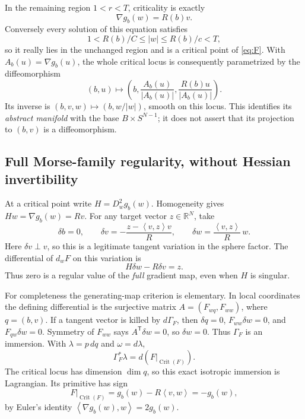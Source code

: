 \documentclass[11pt]{article}
\theoremstyle{remark}
\newcommand{\R}{\mathbb R}
\newcommand{\Crit}{\operatorname{Crit}}
\newcommand{\ip}[2]{\left\langle #1,#2\right\rangle}
\begin{document}
In the remaining region \(1<r<T\), criticality is exactly
\begin{equation}\label{eq:critical}
                     \nabla g_b(w)=R(b)v.
\end{equation}
Conversely every solution of this equation satisfies
\[
           1<R(b)/C\leq |w|\leq R(b)/c<T,
\]
so it really lies in the unchanged region and is a critical point
of \eqref{eq:F}. With \(A_b(u)=\nabla g_b(u)\), the whole critical
locus is consequently parametrized by the diffeomorphism
\begin{equation}\label{eq:param}
 (b,u)\longmapsto
 \left(b,\frac{A_b(u)}{|A_b(u)|},
                 \frac{R(b)u}{|A_b(u)|}\right).
\end{equation}
Its inverse is \((b,v,w)\mapsto(b,w/|w|)\), smooth on this locus.
This identifies its \emph{abstract manifold} with the base
\(B\times S^{N-1}\); it does not assert that its projection to
\((b,v)\) is a diffeomorphism.

\subsection{Full Morse-family regularity, without Hessian invertibility}
At a critical point write \(H=D_w^2g_b(w)\). Homogeneity gives
\(Hw=\nabla g_b(w)=Rv\). For any target vector \(z\in\R^N\), take
\begin{equation}\label{eq:right-inverse}
 \delta b=0,\qquad
 \delta v=-\frac{z-\ip{v}{z}v}{R},\qquad
 \delta w=\frac{\ip{v}{z}}{R}\,w.
\end{equation}
Here \(\delta v\perp v\), so this is a legitimate tangent variation
in the sphere factor. The differential of \(d_wF\) on this variation is
\[
             H\delta w-R\delta v=z.
\]
Thus zero is a regular value of the \emph{full} gradient map,
even when \(H\) is singular.

For completeness the generating-map criterion is elementary.
In local coordinates the defining differential is the surjective
matrix \(A=(F_{wq},F_{ww})\), where \(q=(b,v)\).
If a tangent vector is killed by \(d\Gamma_F\), then
\(\delta q=0\), \(F_{ww}\delta w=0\), and
\(F_{qw}\delta w=0\). Symmetry of \(F_{ww}\) says
\(A^{\mathsf T}\delta w=0\), so \(\delta w=0\).
Thus \(\Gamma_F\) is an immersion. With
\(\lambda=p\,dq\) and \(\omega=d\lambda\),
\[
        \Gamma_F^*\lambda=d(F|_{\Crit(F)}).
\]
The critical locus has dimension \(\dim q\), so this exact
isotropic immersion is Lagrangian. Its primitive has sign
\begin{equation}\label{eq:primitive}
 F|_{\Crit(F)}=g_b(w)-R\ip{v}{w}=-g_b(w),
\end{equation}
by Euler's identity \(\ip{\nabla g_b(w)}{w}=2g_b(w)\).
\end{document}
